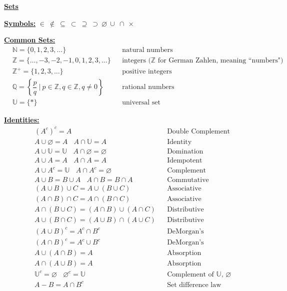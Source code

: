 \documentclass[11pt]{article}
\begin{document}
\newpage
{}

\begin{center}\underline{\bf \huge Sets}\end{center}
\bigskip

\underline{\bf Symbols:} $\in \ \not\in \ \subseteq \ \subset \ \supseteq \ \supset \ \varnothing \ \cup \ \cap \ \times$
\bigskip

\underline{\bf Common Sets:} 
\begin{align*}
    &\mathbb{N} = \{0, 1, 2, 3, \dots\}  &&\text{natural numbers} \\
    &\mathbb{Z} = \{\dots, -3, -2, -1, 0, 1, 2, 3, \dots \}  &&\text{integers ($\mathbb{Z}$ for German Zahlen, meaning ``numbers")} \\
    &\mathbb{Z^+} = \{1,2,3,\dots\}  &&\text{positive integers} \\
    &\mathbb{Q} = \left\{ \dfrac{p}{q} \ \Big| \ p \in \mathbb{Z}, q \in \mathbb{Z}, q \neq 0\right\}  &&\text{rational numbers} \\
    &\mathbb{U} = \{*\}  &&\text{universal set}
\end{align*}
\bigskip

\underline{\bf Identities:}
\begin{align*}
    &(A^c)^c = A &&\text{Double Complement} \\
    &A \cup \varnothing = A \ \ \ \ A \cap \mathbb{U} = A &&\text{Identity} \\
    &A \cup \mathbb{U} = \mathbb{U} \ \ \ \ A \cap \mathbb{\varnothing} = \varnothing &&\text{Domination} \\
    &A \cup A = A \ \ \ \ A \cap A = A &&\text{Idempotent} \\
    &A \cup A^c = \mathbb{U} \ \ \ \ A \cap A^c = \varnothing &&\text{Complement} \\
    &A \cup B = B \cup A \ \ \ \ A \cap B = B \cap A &&\text{Commutative} \\
    &(A \cup B ) \cup C = A \cup (B \cup C) &&\text{Associative} \\
    &(A \cap B) \cap C = A \cap (B \cap C) &&\text{Associative} \\
    &A \cap (B \cup C) = (A \cap B) \cup (A \cap C) &&\text{Distributive} \\
    &A \cup (B \cap C) = (A \cup B) \cap (A \cup C) &&\text{Distributive} \\
    &(A \cup B)^c = A^c \cap B^c &&\text{DeMorgan's} \\
    &(A \cap B)^c = A^c \cup B^c &&\text{DeMorgan's} \\
    &A \cup (A \cap B) = A &&\text{Absorption} \\
    &A \cap (A \cup B) = A &&\text{Absorption} \\
    &\mathbb{U}^c = \varnothing \ \ \ \ \varnothing^c = \mathbb{U} &&\text{Complement of $\mathbb{U}$, $\varnothing$} \\
    &A - B = A \cap B^c &&\text{Set difference law} \\
\end{align*}
\bigskip
\end{document}
